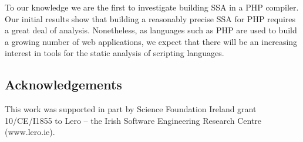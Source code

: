 To our knowledge we are the first to investigate building SSA in a PHP
compiler. Our initial results show that building a reasonably precise
SSA for PHP requires a great deal of analysis. Nonetheless, as
languages such as PHP are used to build a growing number of web
applications, we expect that there will be an increasing interest in
tools for the static analysis of scripting languages.

\subsection*{Acknowledgements}
This work was supported in part by Science Foundation Ireland
grant 10/CE/I1855 to Lero -- the Irish Software Engineering
Research Centre (www.lero.ie).




